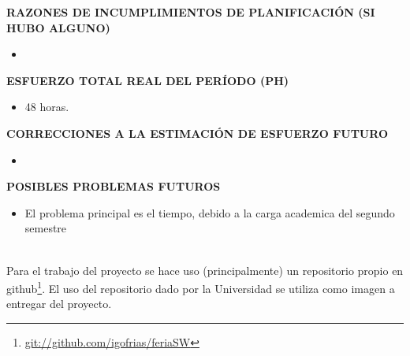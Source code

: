 \documentclass[10pt,letter]{article}
\begin{document}
\vspace{0,5cm}
{\bf RAZONES DE INCUMPLIMIENTOS DE PLANIFICACI\'ON (SI HUBO ALGUNO)}
\begin{itemize}
\item 
\end{itemize}

\vspace{0,5cm}
{\bf ESFUERZO TOTAL REAL DEL PER\'IODO (PH)}
\begin{itemize}
\item 48 horas.
\end{itemize}

\vspace{0,5cm}
{\bf CORRECCIONES A LA ESTIMACI\'ON DE ESFUERZO FUTURO}
\begin{itemize}
\item 
\end{itemize}

\vspace{0,5cm}
{\bf POSIBLES PROBLEMAS FUTUROS}
\begin{itemize}
\item El problema principal es el tiempo, debido a la carga academica del segundo semestre
\end{itemize}


~\\
Para el trabajo del proyecto se hace uso (principalmente) un repositorio propio en github\footnote{\url{git://github.com/igofrias/feriaSW}}. El uso del repositorio dado por la Universidad se utiliza como imagen a entregar del proyecto.
\end{document}
